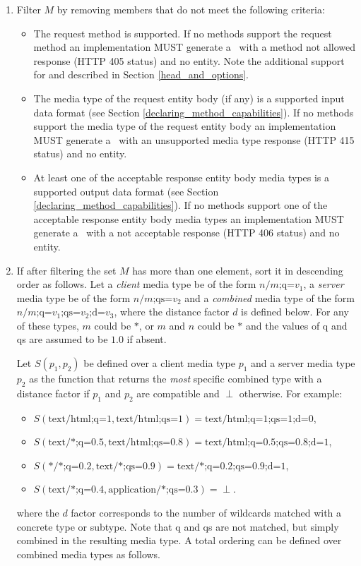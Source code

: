 \begin{enumerate}
\begin{enumerate}
\item \label{filter_methods} Filter $M$ by removing members that do not meet the following criteria:
\begin{itemize}
\item The request method is supported. If no methods support the request method an implementation MUST generate a \WebAppExc\ with a method not allowed response (HTTP 405 status) and no entity. Note the additional support for  and  described in Section \ref{head_and_options}.
\item The media type of the request entity body (if any) is a supported input data format (see Section \ref{declaring_method_capabilities}). If no methods support the media type of the request entity body an implementation MUST generate a \WebAppExc\ with an unsupported media type response (HTTP 415 status) and no entity.
\item At least one of the acceptable response entity body media types is a supported output data format (see Section \ref{declaring_method_capabilities}). If no methods support one of the acceptable response entity body media types an implementation MUST generate a \WebAppExc\ with a not acceptable response (HTTP 406 status) and no entity.
\end{itemize} 

\newcommand{\bottom}{\perp}

\item If after filtering the set $M$ has more than one element, sort it in descending order as follows. Let a {\em client} media type be of the form $\mbox{$n$/$m$;q=$v_1$}$, a {\em server} media type be of the form $\mbox{$n$/$m$;qs=$v_2$}$ and a {\em combined} media type of the form $\mbox{$n$/$m$;q=$v_1$;qs=$v_2$;d=$v_3$}$, where the distance factor $d$ is defined below. For any of these types, $m$ could be $*$, or $m$ and $n$ could be $*$ and the values of q and qs are assumed to be $1.0$ if absent. 

Let $S(p_1, p_2)$ be defined over a client media type $p_1$ and a server media type $p_2$ as the function that returns the {\em most} specific combined type with a distance factor if $p_1$ and $p_2$ are compatible and $\bottom$ otherwise. For example: 
\begin{itemize}
\item $S(\mbox{text/html;q=1}, \mbox{text/html;qs=1}) = \mbox{text/html;q=1;qs=1;d=0}$,
\item $S(\mbox{text/*;q=0.5}, \mbox{text/html;qs=0.8}) = \mbox{text/html;q=0.5;qs=0.8;d=1}$,
\item $S(\mbox{*/*;q=0.2}, \mbox{text/*;qs=0.9}) = \mbox{text/*;q=0.2;qs=0.9;d=1}$,
\item $S(\mbox{text/*;q=0.4}, \mbox{application/*;qs=0.3}) = \bottom$.
\end{itemize}
where the $d$ factor corresponds to the number of wildcards matched with a concrete type or subtype.
Note that q and qs are not matched, but simply combined in the resulting media type. A total ordering can be defined over combined media types as follows. 


\end{enumerate}
\end{enumerate}
